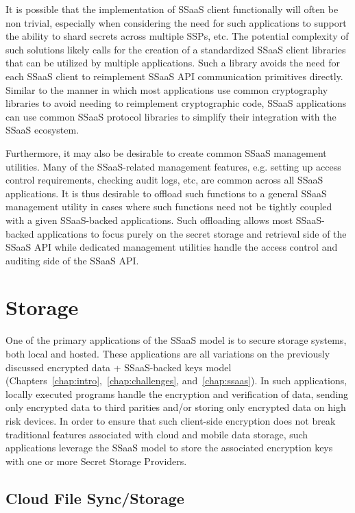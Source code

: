 It is possible that the implementation of SSaaS client functionally
will often be non trivial, especially when considering the need for
such applications to support the ability to shard secrets across
multiple SSPs, etc. The potential complexity of such solutions likely
calls for the creation of a standardized SSaaS client libraries that
can be utilized by multiple applications. Such a library avoids the
need for each SSaaS client to reimplement SSaaS API communication
primitives directly. Similar to the manner in which most applications
use common cryptography libraries to avoid needing to reimplement
cryptographic code, SSaaS applications can use common SSaaS protocol
libraries to simplify their integration with the SSaaS ecosystem.

Furthermore, it may also be desirable to create common SSaaS
management utilities. Many of the SSaaS-related management features,
e.g. setting up access control requirements, checking audit logs, etc,
are common across all SSaaS applications. It is thus desirable to
offload such functions to a general SSaaS management utility in cases
where such functions need not be tightly coupled with a given
SSaaS-backed applications. Such offloading allows most SSaaS-backed
applications to focus purely on the secret storage and retrieval side
of the SSaaS API while dedicated management utilities handle the
access control and auditing side of the SSaaS API.

\section{Storage}

One of the primary applications of the SSaaS model is to secure
storage systems, both local and hosted. These applications are all
variations on the previously discussed encrypted data + SSaaS-backed
keys model (Chapters~\ref{chap:intro},~\ref{chap:challenges},
and~\ref{chap:ssaas}). In such applications, locally executed programs
handle the encryption and verification of data, sending only encrypted
data to third parities and/or storing only encrypted data on high risk
devices. In order to ensure that such client-side encryption does not
break traditional features associated with cloud and mobile data
storage, such applications leverage the SSaaS model to store the
associated encryption keys with one or more Secret Storage Providers.

\subsection{Cloud File Sync/Storage}


